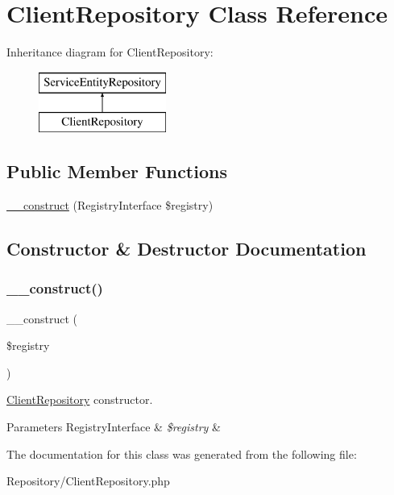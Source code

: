 \hypertarget{class_app_1_1_repository_1_1_client_repository}{}\section{Client\+Repository Class Reference}
\label{class_app_1_1_repository_1_1_client_repository}
Inheritance diagram for Client\+Repository\+:\begin{figure}[H]
\begin{center}
\leavevmode
\includegraphics[height=2.000000cm]{class_app_1_1_repository_1_1_client_repository}
\end{center}
\end{figure}
\subsection*{Public Member Functions}
\begin{DoxyCompactItemize}
\item 
\mbox{\hyperlink{class_app_1_1_repository_1_1_client_repository_aadca7edd263e228921a1860bb6b9c252}{\+\_\+\+\_\+construct}} (Registry\+Interface \$registry)
\end{DoxyCompactItemize}


\subsection{Constructor \& Destructor Documentation}
\mbox{\label{class_app_1_1_repository_1_1_client_repository_aadca7edd263e228921a1860bb6b9c252}} 
\subsubsection{\texorpdfstring{\_\_construct()}{\_\_construct()}}
{\footnotesize\ttfamily \+\_\+\+\_\+construct (\begin{DoxyParamCaption}\item[{Registry\+Interface}]{\$registry }\end{DoxyParamCaption})}

\mbox{\hyperlink{class_app_1_1_repository_1_1_client_repository}{Client\+Repository}} constructor. 
\begin{DoxyParams}[1]{Parameters}
Registry\+Interface & {\em \$registry} & \\
\hline
\end{DoxyParams}


The documentation for this class was generated from the following file\+:\begin{DoxyCompactItemize}
\item 
Repository/Client\+Repository.\+php\end{DoxyCompactItemize}
